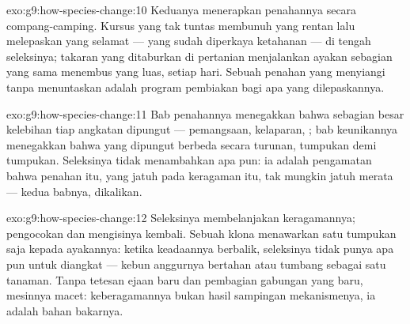 \begin{solution}{exo:g9:how-species-change:10}
Keduanya menerapkan penahannya secara compang-camping.
Kursus yang tak tuntas membunuh yang rentan lalu melepaskan
yang selamat --- yang sudah diperkaya ketahanan --- di tengah
seleksinya; takaran yang ditaburkan di pertanian menjalankan
ayakan sebagian yang sama menembus   yang
luas, setiap hari. Sebuah penahan yang menyiangi tanpa
menuntaskan adalah program pembiakan bagi apa yang
dilepaskannya.
\end{solution}

\begin{solution}{exo:g9:how-species-change:11}
Bab penahannya menegakkan bahwa sebagian besar kelebihan
tiap angkatan dipungut --- pemangsaan, kelaparan,
; bab keunikannya menegakkan bahwa yang dipungut
berbeda secara turunan, tumpukan demi tumpukan. Seleksinya
tidak menambahkan apa pun: ia adalah pengamatan bahwa
penahan itu, yang jatuh pada keragaman itu, tak mungkin
jatuh merata --- kedua babnya, dikalikan.
\end{solution}

\begin{solution}{exo:g9:how-species-change:12}
Seleksinya membelanjakan keragamannya; pengocokan dan
 mengisinya kembali. Sebuah  klona
menawarkan satu tumpukan saja kepada ayakannya: ketika
keadaannya berbalik, seleksinya tidak punya apa pun untuk
diangkat --- kebun anggurnya bertahan atau tumbang sebagai
satu tanaman. Tanpa tetesan ejaan baru dan pembagian gabungan
yang baru, mesinnya macet: keberagamannya bukan hasil
sampingan mekanismenya, ia adalah bahan bakarnya.
\end{solution}

